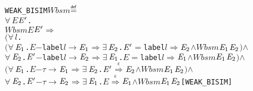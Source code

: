 \documentclass[GCNS]{yincog}
\renewcommand{\HOLConst}[1]{\texttt{#1}}
\renewcommand{\HOLBoundVar}[1]{\ensuremath{\mathit{#1}}}
\renewcommand{\HOLFreeVar}[1]{\ensuremath{\mathit{#1}}}
\renewcommand{\HOLSymConst}[1]{#1}
\renewcommand{\HOLTokenConj}{\ensuremath{\wedge}}
\renewcommand{\HOLTokenDefEquality}{\ensuremath{\mathrel{\overset{\makebox [0pt]{\text{\tiny \textsf{def}}}}{=}}}}
\renewcommand{\HOLTokenExists}{\ensuremath{\exists \,}}
\renewcommand{\HOLTokenForall}{\ensuremath{\forall \,}}
\theoremstyle{remark}
\theoremstyle{theorem}
\theoremstyle{remark}
\newcommand{\HOLTokenEPS}{$\overset{\epsilon}{\Longrightarrow}$}
\newcommand{\HOLTokenTransBegin}{$-$}
\newcommand{\HOLTokenTransEnd}{$\rightarrow$\xspace}
\newcommand{\HOLTokenWeakTransBegin}{$=$}
\newcommand{\HOLTokenWeakTransEnd}{$\Rightarrow$\xspace}
\renewcommand{\HOLTokenImp}{\ensuremath{\Longrightarrow}}
\begin{document}
\begin{alltt}
   \HOLConst{WEAK\_BISIM} \HOLFreeVar{Wbsm} \HOLTokenDefEquality{}
     \HOLSymConst{\HOLTokenForall{}}\HOLBoundVar{E} \ensuremath{\HOLBoundVar{E}\sp{\prime}}.
         \HOLFreeVar{Wbsm} \HOLBoundVar{E} \ensuremath{\HOLBoundVar{E}\sp{\prime}} \HOLSymConst{\HOLTokenImp{}}
         \ensuremath{(}\HOLSymConst{\HOLTokenForall{}}\HOLBoundVar{l}.
              \ensuremath{(}\HOLSymConst{\HOLTokenForall{}}\ensuremath{\HOLBoundVar{E}\sb{\mathrm{1}}}. \HOLBoundVar{E} \HOLTokenTransBegin\HOLConst{label} \HOLBoundVar{l}\HOLTokenTransEnd \ensuremath{\HOLBoundVar{E}\sb{\mathrm{1}}} \HOLSymConst{\HOLTokenImp{}} \HOLSymConst{\HOLTokenExists{}}\ensuremath{\HOLBoundVar{E}\sb{\mathrm{2}}}. \ensuremath{\HOLBoundVar{E}\sp{\prime}} \HOLTokenWeakTransBegin\HOLConst{label} \HOLBoundVar{l}\HOLTokenWeakTransEnd \ensuremath{\HOLBoundVar{E}\sb{\mathrm{2}}} \HOLSymConst{\HOLTokenConj{}} \HOLFreeVar{Wbsm} \ensuremath{\HOLBoundVar{E}\sb{\mathrm{1}}} \ensuremath{\HOLBoundVar{E}\sb{\mathrm{2}}}\ensuremath{)} \HOLSymConst{\HOLTokenConj{}}
              \HOLSymConst{\HOLTokenForall{}}\ensuremath{\HOLBoundVar{E}\sb{\mathrm{2}}}. \ensuremath{\HOLBoundVar{E}\sp{\prime}} \HOLTokenTransBegin\HOLConst{label} \HOLBoundVar{l}\HOLTokenTransEnd \ensuremath{\HOLBoundVar{E}\sb{\mathrm{2}}} \HOLSymConst{\HOLTokenImp{}} \HOLSymConst{\HOLTokenExists{}}\ensuremath{\HOLBoundVar{E}\sb{\mathrm{1}}}. \HOLBoundVar{E} \HOLTokenWeakTransBegin\HOLConst{label} \HOLBoundVar{l}\HOLTokenWeakTransEnd \ensuremath{\HOLBoundVar{E}\sb{\mathrm{1}}} \HOLSymConst{\HOLTokenConj{}} \HOLFreeVar{Wbsm} \ensuremath{\HOLBoundVar{E}\sb{\mathrm{1}}} \ensuremath{\HOLBoundVar{E}\sb{\mathrm{2}}}\ensuremath{)} \HOLSymConst{\HOLTokenConj{}}
         \ensuremath{(}\HOLSymConst{\HOLTokenForall{}}\ensuremath{\HOLBoundVar{E}\sb{\mathrm{1}}}. \HOLBoundVar{E} \HOLTokenTransBegin\HOLSymConst{\ensuremath{\tau}}\HOLTokenTransEnd \ensuremath{\HOLBoundVar{E}\sb{\mathrm{1}}} \HOLSymConst{\HOLTokenImp{}} \HOLSymConst{\HOLTokenExists{}}\ensuremath{\HOLBoundVar{E}\sb{\mathrm{2}}}. \ensuremath{\HOLBoundVar{E}\sp{\prime}} \HOLSymConst{\HOLTokenEPS} \ensuremath{\HOLBoundVar{E}\sb{\mathrm{2}}} \HOLSymConst{\HOLTokenConj{}} \HOLFreeVar{Wbsm} \ensuremath{\HOLBoundVar{E}\sb{\mathrm{1}}} \ensuremath{\HOLBoundVar{E}\sb{\mathrm{2}}}\ensuremath{)} \HOLSymConst{\HOLTokenConj{}}
         \HOLSymConst{\HOLTokenForall{}}\ensuremath{\HOLBoundVar{E}\sb{\mathrm{2}}}. \ensuremath{\HOLBoundVar{E}\sp{\prime}} \HOLTokenTransBegin\HOLSymConst{\ensuremath{\tau}}\HOLTokenTransEnd \ensuremath{\HOLBoundVar{E}\sb{\mathrm{2}}} \HOLSymConst{\HOLTokenImp{}} \HOLSymConst{\HOLTokenExists{}}\ensuremath{\HOLBoundVar{E}\sb{\mathrm{1}}}. \HOLBoundVar{E} \HOLSymConst{\HOLTokenEPS} \ensuremath{\HOLBoundVar{E}\sb{\mathrm{1}}} \HOLSymConst{\HOLTokenConj{}} \HOLFreeVar{Wbsm} \ensuremath{\HOLBoundVar{E}\sb{\mathrm{1}}} \ensuremath{\HOLBoundVar{E}\sb{\mathrm{2}}}\hfill{[WEAK\_BISIM]}
\end{alltt}
\end{document}
